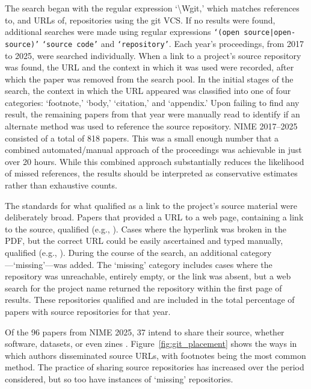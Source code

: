 The search began with the regular expression `\textbackslash Wgit,' which matches references to, and URLs of, repositories using the git VCS.
If no results were found, additional searches were made using regular expressions \texttt{`(open source|open-source)'} \texttt{`source code'} and \texttt{`repository'}.
Each year's proceedings, from 2017 to 2025, were searched individually.
When a link to a project's source repository was found, the URL and the context in which it was used were recorded, after which the paper was removed from the search pool.
In the initial stages of the search, the context in which the URL appeared was classified into one of four categories: `footnote,' `body,' `citation,' and `appendix.'
Upon failing to find any result, the remaining papers from that year were manually read to identify if an alternate method was used to reference the source repository.
NIME 2017--2025 consisted of a total of 818 papers. This was a small enough number that a combined automated/manual approach of the proceedings was achievable in just over 20 hours.
While this combined approach substantially reduces the likelihood of missed references, the results should be interpreted as conservative estimates rather than exhaustive counts.

The standards for what qualified as a link to the project's source material were deliberately broad.
Papers that provided a URL to a web page, containing a link to the source, qualified (e.g., \cite{nime2025_10,nime2025_16,carter_sculpting_2025,nime2025_37,nime2025_67}).
Cases where the hyperlink was broken in the PDF, but the correct URL could be easily ascertained and typed manually, qualified (e.g., \cite{nime2025_58, nime2025_62}).
During the course of the search, an additional category---`missing'---was added. The `missing' category includes cases where the repository was unreachable, entirely empty, or the link was absent, but a web search for the project name returned the repository within the first page of results.
These repositories qualified and are included in the total percentage of papers with source repositories for that year.

Of the 96 papers from NIME 2025, 37 intend to share their source, whether software, datasets, or even zines \cite{nime2025_42}.
Figure~\ref{fig:git_placement} shows the ways in which authors disseminated source URLs, with footnotes being the most common method.
The practice of sharing source repositories has increased over the period considered, but so too have instances of `missing' repositories.

